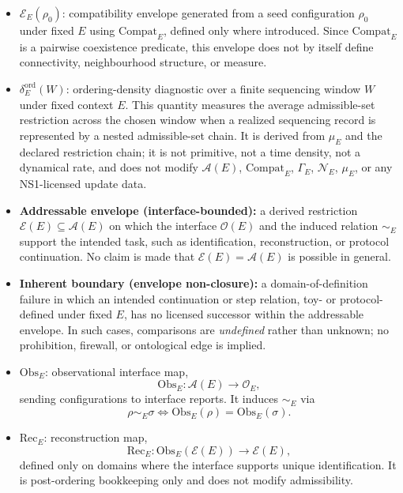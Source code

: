 \documentclass[aps,prx,onecolumn,11pt]{revtex4-2}
\theoremstyle{plain}
\theoremstyle{definition}
\theoremstyle{remark}
\begin{document}
\begin{itemize}

\item $\mathcal{E}_E(\rho_0)$: compatibility envelope generated from a
seed configuration $\rho_0$ under fixed $E$ using
$\mathrm{Compat}_E$, defined only where introduced. Since
$\mathrm{Compat}_E$ is a pairwise coexistence predicate, this envelope
does not by itself define connectivity, neighbourhood structure, or
measure.

\item $\delta_E^{\mathrm{ord}}(W)$: ordering-density diagnostic over a
finite sequencing window $W$ under fixed context $E$. This quantity
measures the average admissible-set restriction across the chosen
window when a realized sequencing record is represented by a nested
admissible-set chain. It is derived from $\mu_E$ and the declared
restriction chain; it is not primitive, not a time density, not a
dynamical rate, and does not modify $\mathcal{A}(E)$,
$\mathrm{Compat}_E$, $\Gamma_E$, $\mathcal{N}_E$, $\mu_E$, or any
NS1-licensed update data.

\item \textbf{Addressable envelope (interface-bounded):} a derived
restriction $\mathcal{E}(E) \subseteq \mathcal{A}(E)$ on which the
interface $\mathcal{O}(E)$ and the induced relation $\sim_E$ support
the intended task, such as identification, reconstruction, or protocol
continuation. No claim is made that
$\mathcal{E}(E) = \mathcal{A}(E)$ is possible in general.

\item \textbf{Inherent boundary (envelope non-closure):} a
domain-of-definition failure in which an intended continuation or step
relation, toy- or protocol-defined under fixed $E$, has no licensed
successor within the addressable envelope. In such cases, comparisons
are \emph{undefined} rather than unknown; no prohibition, firewall, or
ontological edge is implied.

\item $\mathrm{Obs}_E$: observational interface map,
\[
\mathrm{Obs}_E : \mathcal{A}(E) \to \mathcal{O}_E,
\]
sending configurations to interface reports. It induces $\sim_E$ via
\[
\rho \sim_E \sigma
\Leftrightarrow
\mathrm{Obs}_E(\rho) = \mathrm{Obs}_E(\sigma).
\]

\item $\mathrm{Rec}_E$: reconstruction map,
\[
\mathrm{Rec}_E :
\mathrm{Obs}_E(\mathcal{E}(E))
\to
\mathcal{E}(E),
\]
defined only on domains where the interface supports unique
identification. It is post-ordering bookkeeping only and does not
modify admissibility.


\end{itemize}
\end{document}
